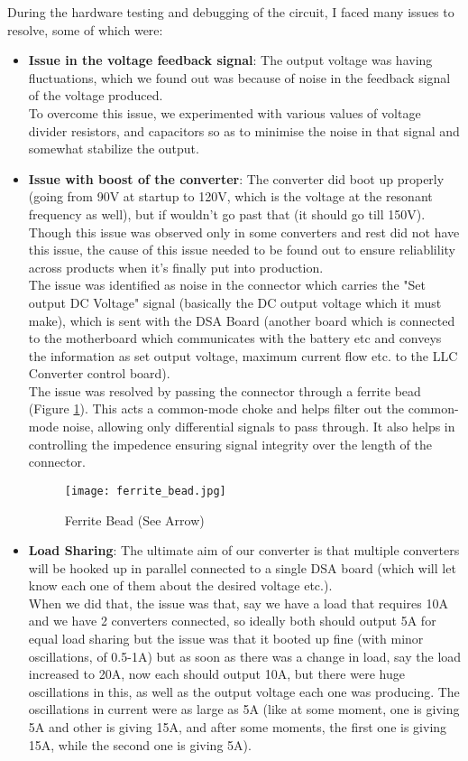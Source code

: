 During the hardware testing and debugging of the circuit, I faced many issues to resolve, some of which were:
\begin{itemize}
    \item \textbf{Issue in the voltage feedback signal}: The output voltage was having fluctuations, which we found out was because of noise in the feedback signal of the voltage produced.\\
    To overcome this issue, we experimented with various values of voltage divider resistors, and capacitors so as to minimise the noise in that signal and somewhat stabilize the output.
    \item \textbf{Issue with boost of the converter}: The converter did boot up properly (going from 90V at startup to 120V, which is the voltage at the resonant frequency as well), but if wouldn't go past that (it should go till 150V). Though this issue was observed only in some converters and rest did not have this issue, the cause of this issue needed to be found out to ensure reliablility across products when it's finally put into production.\\
    The issue was identified as noise in the connector which carries the "Set output DC Voltage" signal (basically the DC output voltage which it must make), which is sent with the DSA Board (another board which is connected to the motherboard which communicates with the battery etc and conveys the information as set output voltage, maximum current flow etc. to the LLC Converter control board).\\
    The issue was resolved by passing the connector through a ferrite bead (Figure \ref{fig:ferrite-bead}). This acts a common-mode choke and helps filter out the common-mode noise, allowing only differential signals to pass through. It also helps in controlling the impedence ensuring signal integrity over the length of the connector.
    \begin{figure}[H]
        \centering
        \texttt{[image: ferrite\_bead.jpg]}
        \caption{Ferrite Bead (See Arrow)}
        \label{fig:ferrite-bead}
    \end{figure}
    \item \textbf{Load Sharing}: The ultimate aim of our converter is that multiple converters will be hooked up in parallel connected to a single DSA board (which will let know each one of them about the desired voltage etc.).\\
    When we did that, the issue was that, say we have a load that requires 10A and we have 2 converters connected, so ideally both should output 5A for equal load sharing but the issue was that it booted up fine (with minor oscillations, of 0.5-1A) but as soon as there was a change in load, say the load increased to 20A, now each should output 10A, but there were huge oscillations in this, as well as the output voltage each one was producing. The oscillations in current were as large as 5A (like at some moment, one is giving 5A and other is giving 15A, and after some moments, the first one is giving 15A, while the second one is giving 5A).\\

\end{itemize}
